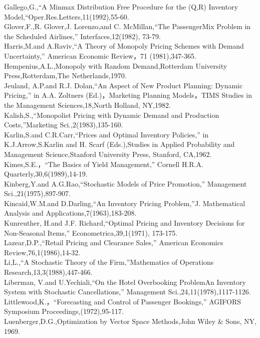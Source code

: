 Gallego,G.,``A Minmax Distribution Free Procedure for the (Q,R)
Inventory Model,``Oper.Res.Letters,11(1992),55-60.\\
Glover,F.,R. Glover,J. Lorenzo,and C. McMillan,``The PassengerMix
Problem in the Scheduled Airlines,'' Interfaces,12(1982), 73-79.\\
Harris,M.and A.Raviv,``A Theory of Monopoly Pricing Schemes with Demand
Uncertainty,'' American Economic Review，71 (1981),347-365.\\
Hempenius,A.L.,Monopoly with Random Demand,Rotterdam University
Press,Rotterdam,The Netherlands,1970.\\
Jeuland, A.P.and R.J. Dolan,``An Aspect of New Product Planning: Dynamic
Pricing,'' in A.A. Zoltners (Ed.)，Marketing Planning Models，TIMS
Studies in the Management Sciences,18,North Holland, NY,1982.\\
Kalish,S.,``Monopolist Pricing with Dynamic Demand and Production
Costs,''Marketing Sci.,2(1983),135-160.\\
Karlin,S.and C.R.Carr,``Prices and Optimal Inventory Policies,'' in
K.J.Arrow,S.Karlin and H. Scarf (Eds.),Studies in Applied Probability
and Management Science,Stanford University Press, Stanford, CA,1962.\\
Kimes,S.E.，``The Basics of Yield Management,'' Cornell H.R.A.
Quarterly,30,6(1989),14-19.\\
Kinberg,Y.and A.G.Rao,``Stochastic Models of Price Promotion,''
Management Sci.,21(1975),897-907.\\
Kincaid,W.M.and D.Darling,``An Inventory Pricing Problem,''J.
Mathematical Analysis and Applications,7(1963),183-208.\\
Kunreuther, H.and J.F. Richard,``Optimal Pricing and Inventory Decisions
for Non-Seasonal Items,'' Econometrica,39,1(1971), 173-175.\\
Lazear,D.P.,``Retail Pricing and Clearance Sales,'' American Economics
Review,76,1(1986),14-32.\\
Li,L.,``A Stochastic Theory of the Firm,''Mathematics of Operations
Research,13,3(1988),447-466.\\
Liberman, V.and U.Yechiali,``On the Hotel Overbooking ProblemAn
Inventory System with Stochastic Cancellations,'' Management
Sci.,24,11(1978),1117-1126.\\
Littlewood,K.，``Forecasting and Control of Passenger Bookings,''
AGIFORS Symposium Proceedings,(1972),95-117.\\
Luenberger,D.G.,Optimization by Vector Space Methods,John Wiley \& Sons,
NY, 1969.\\
